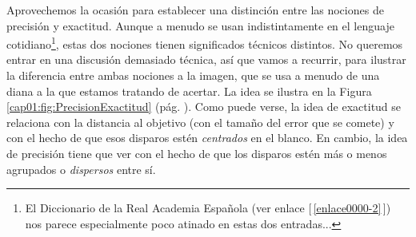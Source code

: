 Aprovechemos la ocasión para establecer una distinción entre las nociones de precisión y exactitud. Aunque a menudo se usan indistintamente en el
lenguaje cotidiano\footnote{El Diccionario de la Real Academia Española (ver enlace [\,\ref{enlace0000-2}\,]\label{enlace0000a-2}) nos
parece especialmente poco atinado en estas dos entradas...}, estas dos nociones tienen significados técnicos distintos. No queremos entrar en una
discusión demasiado técnica, así que vamos a recurrir, para ilustrar la diferencia entre ambas nociones a la imagen, que se usa a menudo de una diana
a la que estamos tratando de acertar. La idea se ilustra en la Figura \ref{cap01:fig:PrecisionExactitud} (pág.
\pageref{cap01:fig:PrecisionExactitud}). Como puede verse, la idea de exactitud se
relaciona con la distancia al objetivo (con el tamaño del error que se comete) y con el hecho de que esos disparos estén {\em centrados} en el blanco.  En cambio, la idea de precisión tiene que ver con el hecho de que los disparos estén más o menos agrupados  o {\em dispersos} entre sí.
